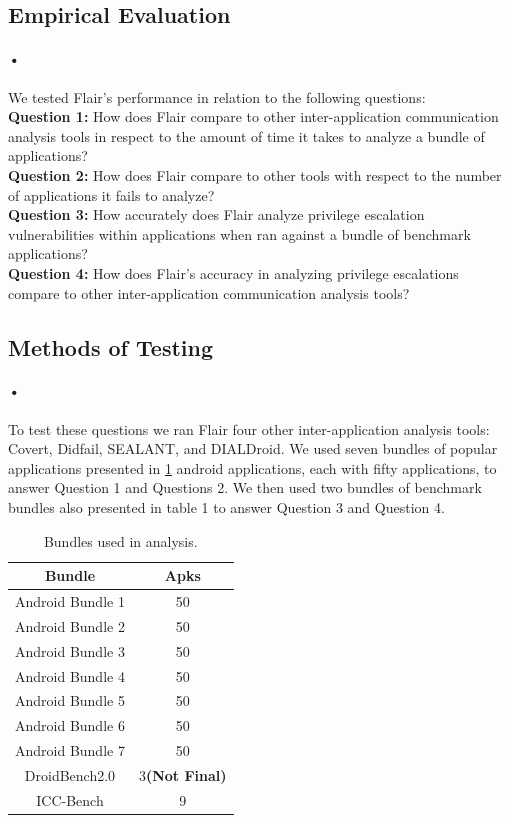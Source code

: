 \documentclass[twocolumn]{article}
\begin{document}
\begin{center}
\section[2]{Empirical Evaluation}
\end{center}

\paragraph{•}
	We tested Flair's performance in relation to the following questions:\\
	\textbf{Question 1:} How does Flair compare to other inter-application communication analysis tools in respect to the amount of time it takes to analyze a bundle of applications?\\
	\textbf{Question 2:} How does Flair compare to other tools with respect to the number of applications it fails to analyze?\\
	\textbf{Question 3:} How accurately does Flair analyze privilege escalation vulnerabilities within applications when ran against a bundle of benchmark applications?\\
	\textbf{Question 4:} How does Flair's accuracy in analyzing privilege escalations compare to other inter-application communication analysis tools?\\

\subsection{Methods of Testing} \label{methods}
\paragraph{•}
	To test these questions we ran Flair four other inter-application analysis tools: Covert, Didfail, SEALANT, and DIALDroid. We used seven bundles of popular applications presented in \ref{table:1} android applications, each with fifty applications, to answer Question 1 and Questions 2. We then used two bundles of benchmark bundles also presented in table 1 to answer Question 3 and Question 4. 

\begin{table}[h]
\begin{center}
\begin{tabular}{ |c c| }
	\hline
	Bundle & Apks\\
	\hline
	Android Bundle 1 & 50\\
	Android Bundle 2 & 50\\
	Android Bundle 3 & 50\\
	Android Bundle 4 & 50\\
	Android Bundle 5 & 50\\
	Android Bundle 6 & 50\\
	Android Bundle 7 & 50\\
	DroidBench2.0 & 3\textbf{(Not Final)}\\
	ICC-Bench & 9\\
	\hline
\end{tabular}
\end{center}
\caption{Bundles used in analysis.}
\label{table:1}
\end{table}
\end{document}
